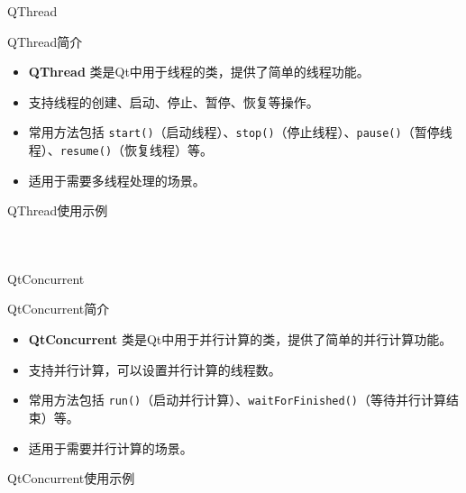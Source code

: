 \documentclass[UTF8,aspectratio=169]{beamer}
\begin{document}
\begin{frame}{QThread}
    \begin{ytublock}{QThread简介}
        \begin{itemize}
            \item \textbf{QThread} 类是Qt中用于线程的类，提供了简单的线程功能。
            \item 支持线程的创建、启动、停止、暂停、恢复等操作。
            \item 常用方法包括 \texttt{start()}（启动线程）、\texttt{stop()}（停止线程）、\texttt{pause()}（暂停线程）、\texttt{resume()}（恢复线程）等。
            \item 适用于需要多线程处理的场景。
        \end{itemize}
    \end{ytublock}
\end{frame}

\begin{frame}[fragile]{QThread使用示例}
    \begin{columns}
        \begin{column}{0.48\textwidth}
            \inputminted[firstline=1,lastline=15]{cpp}{code/qt_thread_example.cpp}
        \end{column}
        \begin{column}{0.48\textwidth}
            \inputminted[firstline=17,lastline=32]{cpp}{code/qt_thread_example.cpp}
        \end{column}
    \end{columns}
\end{frame}

\begin{frame}{QtConcurrent}
    \begin{ytublock}{QtConcurrent简介}
        \begin{itemize}
            \item \textbf{QtConcurrent} 类是Qt中用于并行计算的类，提供了简单的并行计算功能。
            \item 支持并行计算，可以设置并行计算的线程数。
            \item 常用方法包括 \texttt{run()}（启动并行计算）、\texttt{waitForFinished()}（等待并行计算结束）等。
            \item 适用于需要并行计算的场景。
        \end{itemize}
    \end{ytublock}
\end{frame}

\begin{frame}[fragile]{QtConcurrent使用示例}
    \begin{columns}
        \begin{column}{0.48\textwidth}
            \inputminted[firstline=1,lastline=19]{cpp}{code/qt_concurrent_example.cpp}
        \end{column}
        \begin{column}{0.48\textwidth}
            \inputminted[firstline=20,lastline=38]{cpp}{code/qt_concurrent_example.cpp}
        \end{column}
    \end{columns}
\end{frame}
\end{document}
